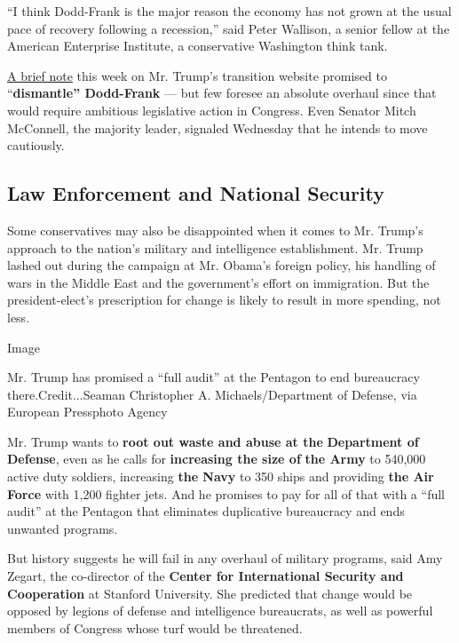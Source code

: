 ``I think Dodd-Frank is the major reason the economy has not grown at
the usual pace of recovery following a recession,'' said Peter Wallison,
a senior fellow at the American Enterprise Institute, a conservative
Washington think tank.

\href{https://www.greatagain.gov/policy/financial-services.html}{A brief
note} this week on Mr. Trump's transition website promised to
``\textbf{dismantle'' Dodd-Frank} --- but few foresee an absolute
overhaul since that would require ambitious legislative action in
Congress. Even Senator Mitch McConnell, the majority leader, signaled
Wednesday that he intends to move cautiously.

\hypertarget{law-enforcement-and-national-security}{%
\subsection{Law Enforcement and National
Security}\label{law-enforcement-and-national-security}}

Some conservatives may also be disappointed when it comes to Mr. Trump's
approach to the nation's military and intelligence establishment. Mr.
Trump lashed out during the campaign at Mr. Obama's foreign policy, his
handling of wars in the Middle East and the government's effort on
immigration. But the president-elect's prescription for change is likely
to result in more spending, not less.

Image

Mr. Trump has promised a ``full audit'' at the Pentagon to end
bureaucracy there.Credit...Seaman Christopher A. Michaels/Department of
Defense, via European Pressphoto Agency

Mr. Trump wants to \textbf{root out waste and abuse at the}
\textbf{Department of Defense}, even as he calls for \textbf{increasing
the size of} \textbf{the Army} to 540,000 active duty soldiers,
increasing \textbf{the Navy} to 350 ships and providing \textbf{the Air
Force} with 1,200 fighter jets. And he promises to pay for all of that
with a ``full audit'' at the Pentagon that eliminates duplicative
bureaucracy and ends unwanted programs.

But history suggests he will fail in any overhaul of military programs,
said Amy Zegart, the co-director of the \textbf{Center for International
Security and Cooperation} at Stanford University. She predicted that
change would be opposed by legions of defense and intelligence
bureaucrats, as well as powerful members of Congress whose turf would be
threatened.

